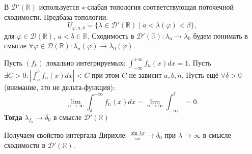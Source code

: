 \begin{to_def}
	В $\mathcal{D}'(\mathbb{R})$ используется $\star$-слабая топология соответствующая поточечной сходимости. Предбаза топологии:
	\begin{equation*}
		U_{\varphi,a,b} = \{\lambda \in \mathcal{D}'(\mathbb{R}) \mid a < \lambda(\varphi) < \beta\},
	\end{equation*}
	для $\varphi \in \mathcal{D}(\mathbb{R})$, $a< b \in \mathbb{R}$. Сходимость в $\mathcal{D}'(\mathbb{R}): \lambda_n \to \lambda_0$ будем понимать в смысле $\forall \varphi \in \mathcal{D}(\mathbb{R}): \lambda_n(\varphi) \to \lambda_0(\varphi)$.
\end{to_def}

\begin{to_thr}
	Пусть $(f_k)$ локально интегрируемых: $\int_{-\infty}^{+\infty} f_n(x) d x = 1$. Пусть $\exists C >0 \colon |\int_{a}^{b} f_n(x) d x|<C$ при этом $C$ не зависит $a,b,n$. Пусть ещё $\forall \delta>0$ (внимание, это не дельта-функция):
	\begin{equation*}
		\lim_{n \to \infty} \int_{\delta}^{+\infty} f_n(x) d x = \lim_{n \to \infty} \int_{-\infty}^{\delta} = 0.
	\end{equation*}
	\textbf{Тогда} $\lambda_{f_n} \to \delta_0$ в смысле $\mathcal{D}'(\mathbb{R})$
\end{to_thr}

\begin{to_suj}
	Получаем свойство интергала Дирихле: $\frac{\sin \lambda x}{\pi x} \to \delta_0$ при $\lambda \to \infty$ в смысле сходимости в $\mathcal{D}'(\mathbb{R})$.
\end{to_suj}